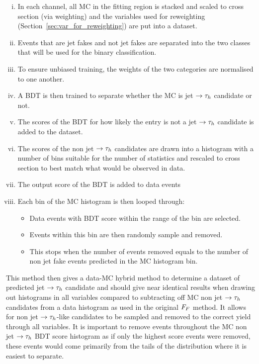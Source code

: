 \begin{enumerate}[i)]
  \item In each channel, all \ac{MC} in the fitting region is stacked and scaled to cross section (via weighting) and the variables used for reweighting (Section~\ref{sec:var_for_reweighting}) are put into a dataset.
  \item Events that are jet fakes and not jet fakes are separated into the two classes that will be used for the binary classification.
  \item To ensure unbiased training, the weights of the two categories are normalised to one another.
  \item A \ac{BDT} is then trained to separate whether the \ac{MC} is jet $\rightarrow\tau_{h}$ candidate or not.
  \item The scores of the \ac{BDT} for how likely the entry is not a jet $\rightarrow\tau_{h}$ candidate is added to the dataset.
  \item The scores of the non jet $\rightarrow\tau_{h}$ candidates are drawn into a histogram with a number of bins suitable for the number of statistics and rescaled to cross section to best match what would be observed in data.
  \item The output score of the \ac{BDT} is added to data events
  \item Each bin of the \ac{MC} histogram is then looped through:
  \begin{itemize}
    \item Data events with \ac{BDT} score within the range of the bin are selected.
    \item Events within this bin are then randomly sample and removed.
    \item This stops when the number of events removed equals to the number of non jet fake events predicted in the \ac{MC} histogram bin.
  \end{itemize}
\end{enumerate} 

This method then gives a data-\ac{MC} hybrid method to determine a dataset of predicted jet $\rightarrow\tau_{h}$ candidate and should give near identical results when drawing out histograms in all variables compared to subtracting off \ac{MC} non jet $\rightarrow\tau_{h}$ candidates from a data histogram as used in the original $F_{F}$ method.
It allows for non jet $\rightarrow\tau_{h}$-like candidates to be sampled and removed to the correct yield through all variables.
It is important to remove events throughout the \ac{MC} non jet $\rightarrow\tau_{h}$ \ac{BDT} score histogram as if only the highest score events were removed, these events would come primarily from the tails of the distribution where it is easiest to separate.


